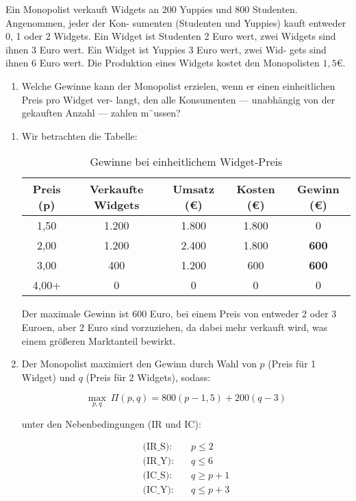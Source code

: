 \begin{question}
    Ein Monopolist verkauft Widgets an 200 Yuppies und 800 Studenten. Angenommen, jeder der Kon-
sumenten (Studenten und Yuppies) kauft entweder 0, 1 oder 2 Widgets. Ein Widget ist Studenten
2 Euro wert, zwei Widgets sind ihnen 3 Euro wert. Ein Widget ist Yuppies 3 Euro wert, zwei Wid-
gets sind ihnen 6 Euro wert. Die Produktion eines Widgets kostet den Monopolisten $1,5€$.
\begin{enumerate}
    \item Welche Gewinne kann der Monopolist erzielen, wenn er einen einheitlichen Preis pro Widget ver-
langt, den alle Konsumenten — unabhängig von der gekauften Anzahl — zahlen m¨ussen?
\end{enumerate}
\end{question}
\begin{solution}
    \begin{enumerate}
        \item Wir betrachten die Tabelle:\begin{center} \begin{table}[h!]
\centering
\begin{tabular}{|c|c|c|c|c|}
\hline
\textbf{Preis (p)} & \textbf{Verkaufte Widgets} & \textbf{Umsatz (€)} & \textbf{Kosten (€)} & \textbf{Gewinn (€)} \\
\hline
1{,}50 & 1.200 & 1.800 & 1.800 & 0 \\
\hline
2{,}00 & 1.200 & 2.400 & 1.800 & \textbf{600} \\
\hline
3{,}00 & 400 & 1.200 & 600 & \textbf{600} \\
\hline
4{,}00+ & 0 & 0 & 0 & 0 \\
\hline
\end{tabular}
\caption{Gewinne bei einheitlichem Widget-Preis}
\end{table} \end{center}
Der maximale Gewinn ist $600$ Euro, bei einem Preis von entweder 2 oder 3 Euroen, aber 2 Euro sind vorzuziehen, da dabei mehr verkauft wird, was einem größeren Marktanteil bewirkt.
\item Der Monopolist maximiert den Gewinn durch Wahl von $p$ (Preis für 1 Widget) und $q$ (Preis für 2 Widgets), sodass:

\[
\max_{p, q} \ \Pi(p, q) = 800(p - 1{,}5) + 200(q - 3)
\]

unter den Nebenbedingungen (IR und IC):

\begin{align*}
\text{(IR\_S):} \quad & p \leq 2 \\
\text{(IR\_Y):} \quad & q \leq 6 \\
\text{(IC\_S):} \quad & q \geq p + 1 \\
\text{(IC\_Y):} \quad & q \leq p + 3
\end{align*}



\end{enumerate}
\end{solution}
